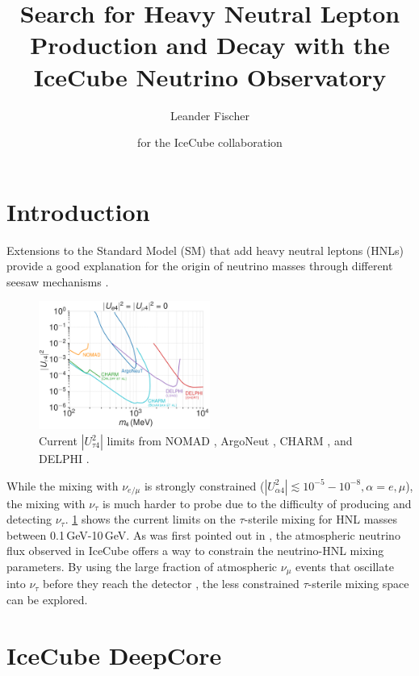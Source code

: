 \documentclass[a4paper,11pt]{article}
\title{Search for Heavy Neutral Lepton Production and Decay with the IceCube Neutrino Observatory}
\author*[a]{Leander Fischer}
\author{for the IceCube collaboration}
\affiliation[a]{DESY, D-15738 Zeuthen, Germany}
\begin{document}
\maketitle


\section{Introduction}

Extensions to the Standard Model (SM) that add heavy neutral leptons (HNLs) provide a good explanation for the origin of neutrino masses through different seesaw mechanisms \cite{10.1143/PTP.64.1103}.
\begin{figure}
  \includegraphics[width=0.5\textwidth]{figures/UtauN_custom_plots_LF_grid_white.png}
  \caption{Current $|U_{\tau4}^2|$ limits from NOMAD \cite{NOMAD:2001eyx}, ArgoNeut \cite{ArgoNeuT:2021clc}, CHARM \cite{Orloff:2002de, Boiarska:2021yho}, and DELPHI \cite{DELPHI:1996qcc}.}
  \label{fig:hnl_limits}
\end{figure}
While the mixing with $\nu_{e/\mu}$ is strongly constrained ($|U_{\alpha4}^2| \lesssim 10^{-5}-10^{-8}, \alpha=e,\mu$), the mixing with $\nu_{\tau}$ is much harder to probe due to the difficulty of producing and detecting $\nu_\tau$. \cref{fig:hnl_limits} shows the current limits on the $\tau$-sterile mixing for HNL masses between 0.1\,GeV-10\,GeV. As was first pointed out in \cite{Coloma:2017ppo}, the atmospheric neutrino flux observed in IceCube offers a way to constrain the neutrino-HNL mixing parameters. By using the large fraction of atmospheric $\nu_{\mu}$ events that oscillate into $\nu_{\tau}$ before they reach the detector \cite{IceCube:2019dqi}, the less constrained $\tau$-sterile mixing space can be explored.


\vspace{-0.4cm}
\section{IceCube DeepCore}
\end{document}
